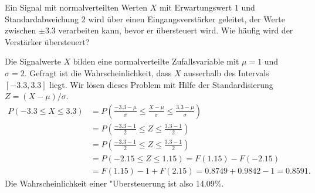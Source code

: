 Ein Signal mit normalverteilten Werten $X$ mit Erwartungswert
$1$ und Standardabweichung $2$ wird über einen Eingangsverstärker
geleitet, der Werte zwischen $\pm3.3$ verarbeiten kann, bevor
er übersteuert wird. Wie häufig wird der Verstärker übersteuert?

\begin{loesung}
Die Signalwerte $X$ bilden eine normalverteilte Zufallsvariable mit $\mu = 1$
und $\sigma=2$. Gefragt ist die Wahrscheinlichkeit, dass
$X$ ausserhalb des Intervals $[-3.3, 3.3]$ liegt. Wir lösen dieses
Problem mit Hilfe der Standardisierung $Z=(X-\mu)/\sigma$.
\begin{align*}
P(-3.3\le X\le 3.3)
&=
P\left(
\frac{-3.3-\mu }{\sigma}
\le
\frac{X-\mu}{\sigma}
\le
\frac{3.3-\mu }{\sigma}
\right)
\\
&=
P\left(
\frac{-3.3-1}{2}
\le
Z
\le
\frac{3.3-1}{2}
\right)
\\
&=
P\left(
\frac{-3.3-1}{2}
\le
Z
\le
\frac{3.3-1}{2}
\right)
\\
&=P(-2.15 \le Z \le 1.15)
=F(1.15)-F(-2.15)\\
&=F(1.15)-1+F(2.15)
=0.8749+0.9842 - 1=0.8591.
\end{align*}
Die Wahrscheinlichkeit einer "Ubersteuerung ist also 14.09\%.
\end{loesung}

